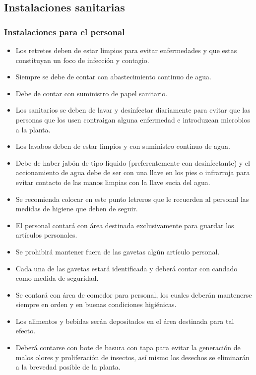 \subsection{Instalaciones sanitarias}

\subsubsection{Instalaciones para el personal}

\begin{itemize}
	\item Los retretes deben de estar limpios para evitar enfermedades y que estas constituyan un foco de infección y contagio.
	\item Siempre se debe de contar con abastecimiento continuo de agua.
	\item Debe de contar con suministro de papel sanitario.
	\item Los sanitarios se deben de lavar y desinfectar diariamente para evitar que las personas que los usen contraigan alguna enfermedad e introduzcan microbios a la planta.
	\item Los lavabos deben de estar limpios y con suministro continuo de agua.
	\item Debe de haber jabón de tipo líquido (preferentemente con desinfectante) y el accionamiento de agua debe de ser con una llave en los pies o infrarroja para evitar contacto de las manos limpias con la llave sucia del agua.
	\item Se recomienda colocar en este punto letreros que le recuerden al personal las medidas de higiene que deben de seguir.
	\item El personal contará con área destinada exclusivamente para guardar los artículos personales.
	\item Se prohibirá mantener fuera de las gavetas algún artículo personal.
	\item Cada una de las gavetas estará identificada y deberá contar con candado como medida de seguridad.
	\item Se contará con área de comedor para personal, los cuales deberán mantenerse siempre en orden y en buenas condiciones higiénicas.
	\item Los alimentos y bebidas serán depositados en el área destinada para tal efecto.
	\item Deberá contarse con bote de basura con tapa para evitar la generación de malos olores y proliferación de insectos, así mismo los desechos se eliminarán a la brevedad posible de la planta.
\end{itemize}

